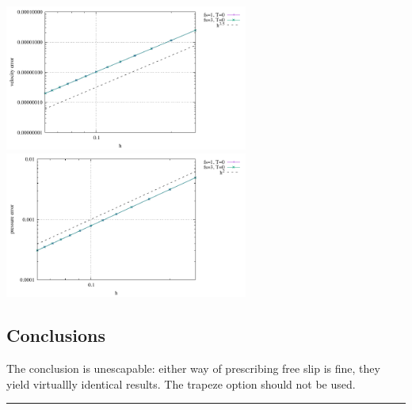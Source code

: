 \begin{center}
\includegraphics[width=8cm]{python_codes/fieldstone_151/results/test6/errv}
\includegraphics[width=8cm]{python_codes/fieldstone_151/results/test6/errp}
\end{center}





\subsection*{Conclusions}

The conclusion is unescapable: either way of prescribing free slip is fine, they yield 
virtuallly identical results. The trapeze option should not be used.  


\par\noindent\rule{\textwidth}{0.4pt}

\vspace{.5cm}

